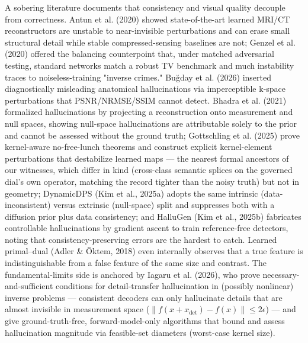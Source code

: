 \documentclass[11pt]{article}
\begin{document}
A sobering literature documents that consistency and visual quality decouple from correctness. Antun et al. (2020) showed state-of-the-art learned MRI/CT reconstructors are unstable to near-invisible perturbations and can erase small structural detail while stable compressed-sensing baselines are not; Genzel et al. (2020) offered the balancing counterpoint that, under matched adversarial testing, standard networks match a robust TV benchmark and much instability traces to noiseless-training "inverse crimes." Buğday et al. (2026) inserted diagnostically misleading anatomical hallucinations via imperceptible k-space perturbations that PSNR/NRMSE/SSIM cannot detect. Bhadra et al. (2021) formalized hallucinations by projecting a reconstruction onto measurement and null spaces, showing null-space hallucinations are attributable solely to the prior and cannot be assessed without the ground truth; Gottschling et al. (2025) prove kernel-aware no-free-lunch theorems and construct explicit kernel-element perturbations that destabilize learned maps --- the nearest formal ancestors of our witnesses, which differ in kind (cross-class semantic splices on the governed dial's own operator, matching the record tighter than the noisy truth) but not in geometry; DynamicDPS (Kim et al., 2025a) adopts the same intrinsic (data-inconsistent) versus extrinsic (null-space) split and suppresses both with a diffusion prior plus data consistency; and HalluGen (Kim et al., 2025b) fabricates controllable hallucinations by gradient ascent to train reference-free detectors, noting that consistency-preserving errors are the hardest to catch. Learned primal--dual (Adler \& Öktem, 2018) even internally observes that a true feature is indistinguishable from a false feature of the same size and contrast. The fundamental-limits side is anchored by Iagaru et al. (2026), who prove necessary-and-sufficient conditions for detail-transfer hallucination in (possibly nonlinear) inverse problems --- consistent decoders can only hallucinate details that are almost invisible in measurement space ($\lVert f(x + x_{\det}) - f(x)\rVert \le 2\epsilon$) --- and give ground-truth-free, forward-model-only algorithms that bound and assess hallucination magnitude via feasible-set diameters (worst-case kernel size).
\end{document}
